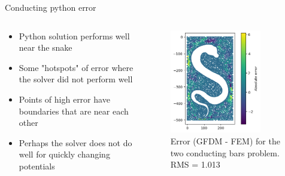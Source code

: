 \documentclass{beamer}
\begin{document}
\begin{frame}{Conducting python error}
\begin{columns}
    \begin{column}{0.5\linewidth}
    \begin{itemize}
        \item Python solution performs well near the snake
        \item Some "hotspots" of error where the solver did not perform well
        \item Points of high error have boundaries that are near each other
        \item Perhaps the solver does not do well for quickly changing potentials
    \end{itemize}
    \end{column}
    \begin{column}{0.5\linewidth}
        \begin{figure}[h]
        \includegraphics[width=0.80\textwidth]{Figures/Python_Error.png}
        \caption{Error (GFDM - FEM) for the two conducting bars problem. RMS = 1.013}        \label{fig:python_error}
        \end{figure}
    \end{column}
\end{columns}
\end{frame}
\end{document}
